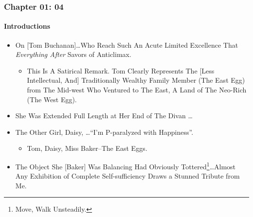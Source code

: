 \begin{frame}
\frametitle{Chapter 01: 04}
\framesubtitle{Introductions}
\label{slide:chapter-01-04}
\begin{itemize}
\item On [Tom Buchanan]\dots Who Reach Such An \alert{Acute Limited Excellence} That \textit{Everything After} Savors of \alert{Anticlimax}.
\begin{itemize}
\pause
\item This Is A Satirical Remark. Tom Clearly Represents The [Less Intellectual, And] Traditionally Wealthy Family Member (\alert{The East Egg}) from The Mid-west Who Ventured to The East, A Land of The Neo-Rich (\alert{The West Egg}).
\end{itemize}
\pause \item She Was Extended Full Length at Her End of The Divan \dots
\pause \item The Other Girl, Daisy, \dots \alert{``I'm P-paralyzed with Happiness''}.
\begin{itemize}
\pause \item Tom, Daisy, Miss Baker--The \alert{East Eggs}.
\end{itemize}
\pause\item The Object She [Baker] Was Balancing Had Obviously Tottered{\footnote{Move, Walk Unsteadily.}}\dots Almost \alert{Any Exhibition of Complete Self-sufficiency Draws a Stunned Tribute from Me}.
\end{itemize}
\end{frame}
